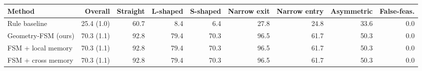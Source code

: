 \begin{tabular}{lrrrrrrrr}
\toprule
Method & Overall & Straight & L-shaped & S-shaped & Narrow exit & Narrow entry & Asymmetric & False-feas. \\
\midrule
Rule baseline & 25.4 (1.0) & 60.7 & 8.4 & 6.4 & 27.8 & 24.8 & 33.6 & 0.0 \\
Geometry-FSM (ours) & 70.3 (1.1) & 92.8 & 79.4 & 70.3 & 96.5 & 61.7 & 50.3 & 0.0 \\
FSM + local memory & 70.3 (1.1) & 92.8 & 79.4 & 70.3 & 96.5 & 61.7 & 50.3 & 0.0 \\
FSM + cross memory & 70.3 (1.1) & 92.8 & 79.4 & 70.3 & 96.5 & 61.7 & 50.3 & 0.0 \\
\bottomrule
\end{tabular}
